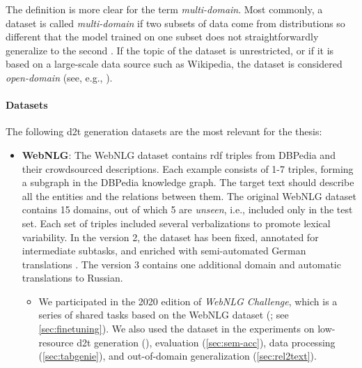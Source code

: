 {The definition is more clear for the term \emph{multi-domain}. Most commonly, a dataset is called \emph{multi-domain} if two subsets of data come from distributions so different that the model trained on one subset does not straightforwardly generalize to the second \cite{vanderleeCACAPODatasetMultilingual2020,budzianowskiMultiWOZLargeScaleMultiDomain2020,rastogiScalableMultiDomainConversational2020}. If the topic of the dataset is unrestricted, or if it is based on a large-scale data source such as Wikipedia, the dataset is considered \emph{open-domain} (see, e.g., \citealp{chenLogicalNaturalLanguage2020,nan2021dart,kann2022open}).

\paragraph{Datasets} The following \ac{d2t} generation datasets are the most relevant for the thesis:

\begin{itemize}
    \item \textbf{WebNLG}: The WebNLG dataset \cite{gardentCreatingTrainingCorpora2017,gardentWebNLGChallengeGenerating2017} contains \ac{rdf} triples from DBPedia \cite{auer2007dbpedia} and their crowdsourced descriptions. Each example consists of 1-7 triples, forming a subgraph in the DBPedia knowledge graph. The target text should describe all the entities and the relations between them. The original WebNLG dataset \cite{gardentCreatingTrainingCorpora2017} contains 15 domains, out of which 5 are \emph{unseen}, i.e., included only in the test set. Each set of triples included several verbalizations to promote lexical variability. In the version 2, the dataset has been fixed, annotated for intermediate subtasks, and enriched with semi-automated German translations \cite{shimorinaHandlingRareItems2018,castroferreiraEnrichingWebNLGCorpus2018}. The version 3 \cite{ferreira20202020} contains one additional domain and automatic translations to Russian.
          \begin{itemize}
              \item
                    We participated in the 2020 edition of \emph{WebNLG Challenge}, which is a series of shared tasks based on the WebNLG dataset (\citealp{gardentWebNLGChallengeGenerating2017,shimorinaWebNLGChallengeHuman2019,ferreira20202020,cripwell2023WebNLGShared2023}; see \autoref{sec:finetuning}). We also used the dataset in the experiments on low-resource \ac{d2t} generation (), evaluation (\autoref{sec:sem-acc}), data processing (\autoref{sec:tabgenie}), and out-of-domain generalization (\autoref{sec:rel2text}).
          \end{itemize}


\end{itemize}}
